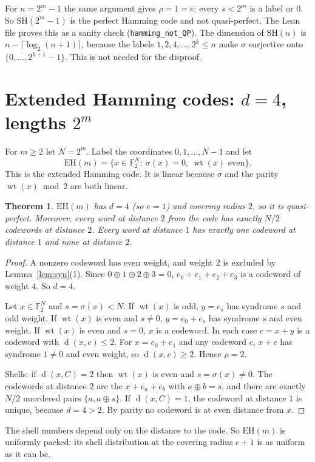 \documentclass[11pt]{article}
\newtheorem{theorem}{Theorem}
\theoremstyle{definition}
\theoremstyle{remark}
\newcommand{\F}{\mathbb{F}_2}
\newcommand{\wt}{\operatorname{wt}}
\newcommand{\dd}{\operatorname{d}}
\begin{document}
For $n=2^m-1$ the same argument gives $\rho=1=e$: every $s<2^m$ is a label or
$0$. So $\mathrm{SH}(2^m-1)$ is the perfect Hamming code and not
quasi-perfect. The Lean file proves this as a sanity check
(\texttt{hamming\_not\_QP}). The dimension of $\mathrm{SH}(n)$ is
$n-\lceil\log_2(n+1)\rceil$, because the labels $1,2,4,\dots,2^k\le n$ make
$\sigma$ surjective onto $\{0,\dots,2^{k+1}-1\}$. This is not needed for the
disproof.

\section{\texorpdfstring{Extended Hamming codes: $d=4$, lengths $2^m$}{Extended Hamming codes}}
For $m\ge 2$ let $N=2^m$. Label the coordinates $0,1,\dots,N-1$ and let
\[
\mathrm{EH}(m)=\{x\in\F^N:\ \sigma(x)=0,\ \wt(x)\text{ even}\}.
\]
This is the extended Hamming code. It is linear because $\sigma$ and the
parity $\wt(x)\bmod 2$ are both linear.

\begin{theorem}\label{thm:eh}
$\mathrm{EH}(m)$ has $d=4$ (so $e=1$) and covering radius $2$, so it is
quasi-perfect. Moreover, every word at distance $2$ from the code has exactly
$N/2$ codewords at distance $2$. Every word at distance $1$ has exactly one
codeword at distance $1$ and none at distance $2$.
\end{theorem}
\begin{proof}
A nonzero codeword has even weight, and weight $2$ is excluded by
Lemma~\ref{lem:syn}(1). Since $0\oplus1\oplus2\oplus3=0$, $e_0+e_1+e_2+e_3$ is a
codeword of weight $4$. So $d=4$.

Let $x\in\F^N$ and $s=\sigma(x)<N$. If $\wt(x)$ is odd, $y=e_s$ has syndrome
$s$ and odd weight. If $\wt(x)$ is even and $s\ne 0$, $y=e_0+e_s$ has syndrome
$s$ and even weight. If $\wt(x)$ is even and $s=0$, $x$ is a codeword. In each
case $c=x+y$ is a codeword with $\dd(x,c)\le 2$. For $x=e_0+e_1$ and any
codeword $c$, $x+c$ has syndrome $1\neq 0$ and even weight, so
$\dd(x,c)\ge 2$. Hence $\rho=2$.

Shells: if $\dd(x,C)=2$ then $\wt(x)$ is even and $s=\sigma(x)\ne 0$. The
codewords at distance $2$ are the $x+e_a+e_b$ with $a\oplus b=s$, and there
are exactly $N/2$ unordered pairs $\{a,a\oplus s\}$. If $\dd(x,C)=1$, the
codeword at distance $1$ is unique, because $d=4>2$. By parity no codeword is
at even distance from $x$.
\end{proof}

The shell numbers depend only on the distance to the code. So
$\mathrm{EH}(m)$ is uniformly packed: its shell distribution at the covering
radius $e+1$ is as uniform as it can be.
\end{document}
